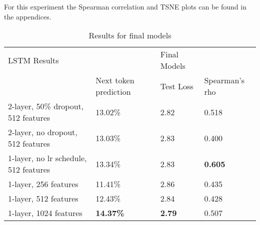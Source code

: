 For this experiment the Spearman correlation and TSNE plots can be found in the appendices.
\begin{table}[!ht]
  \centering
\begin{tabular}{|l|lll|}
\hline
LSTM Results                          &                                                     & Final Models                       &                \\ \cline{2-4}
                                      & \multicolumn{1}{l|}{Next token prediction}          & \multicolumn{1}{l|}{Test Loss}     & Spearman's rho \\ \hline
2-layer, 50\% dropout, 512 features   & \multicolumn{1}{l|}{13.02\%}                        & \multicolumn{1}{l|}{2.82}          & 0.518          \\ \hline
2-layer, no dropout, 512 features     & \multicolumn{1}{l|}{13.03\%}                        & \multicolumn{1}{l|}{2.83}          & 0.400          \\ \hline
1-layer, no lr schedule, 512 features & \multicolumn{1}{l|}{13.34\%}                        & \multicolumn{1}{l|}{2.83}          & \textbf{0.605} \\ \hline
1-layer, 256 features                 & \multicolumn{1}{l|}{11.41\%}                        & \multicolumn{1}{l|}{2.86}          & 0.435          \\ \hline
1-layer, 512 features                 & \multicolumn{1}{l|}{12.43\%}                        & \multicolumn{1}{l|}{2.84}          & 0.428          \\ \hline
1-layer, 1024 features                & \multicolumn{1}{l|}{\textbf{14.37\%}}               & \multicolumn{1}{l|}{\textbf{2.79}} & 0.507          \\ \hline
\end{tabular}
\caption{Results for final models}
\label{tab:final}
\end{table}

